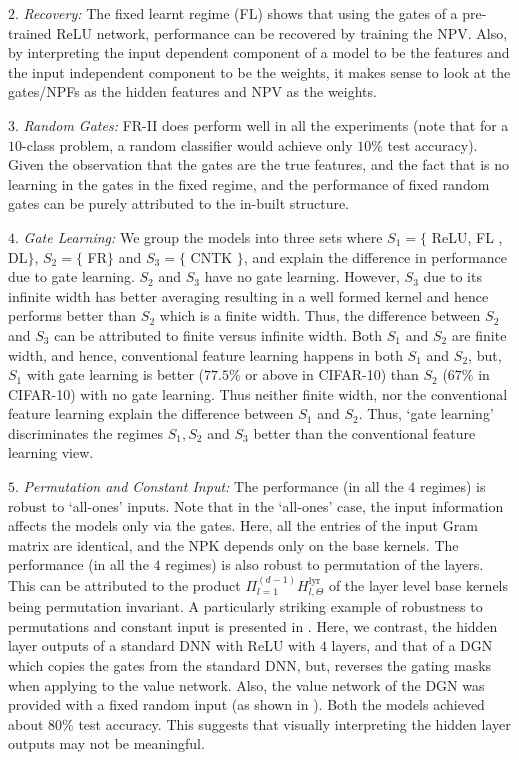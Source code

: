 \indent\quad $2.$ \emph{Recovery:} The fixed learnt regime  (FL) shows that using the gates of a pre-trained ReLU network, performance can be recovered by training the NPV. Also, by interpreting the input dependent component of a model to be the features and the input independent component to be the weights, it makes sense to look at the gates/NPFs as the hidden features and NPV as the weights.%

\indent\quad $3.$ \emph{Random Gates:} FR-II does perform well in all the experiments (note that for a $10$-class problem, a random classifier would achieve only $10\%$ test accuracy). Given the observation that the gates are the true features, and the fact that is no learning in the gates in the fixed regime, and the performance of fixed random gates can be purely attributed to the in-built structure.

\indent\quad $4.$ \emph{Gate Learning:} We group the models into three sets where $S_1=\{$ ReLU, FL , DL$\}$, $S_2=\{$ FR$\}$ and $S_3=\{$ CNTK $\}$, and explain the difference in performance due to gate learning.
 $S_2$ and $S_3$ have no gate learning. However,  $S_3$ due to its infinite width has better averaging resulting in a well formed kernel and hence performs better than $S_2$ which is a finite width. Thus, the difference between $S_2$ and $S_3$ can be attributed to finite versus infinite width. Both $S_1$ and $S_2$ are finite width, and hence, conventional feature learning happens in both $S_1$ and $S_2$, but, $S_1$ with gate learning is better ($77.5\%$ or above in CIFAR-10) than $S_2$ ($67\%$ in CIFAR-10) with no gate learning. Thus neither finite width, nor the conventional feature learning explain the difference between $S_1$ and $S_2$. Thus, `gate learning' discriminates the regimes $S_1, S_2$ and $S_3$ better than the conventional feature learning view.

\indent\quad $5.$ \emph{Permutation and Constant Input:} The performance (in all the $4$ regimes) is  robust to `all-ones' inputs. Note that in the `all-ones' case, the input information affects the models only via the gates. Here, all the entries of the input Gram matrix are identical, and the NPK depends only on the base kernels. The performance (in all the $4$ regimes) is also robust to permutation of the layers. This can be attributed to the product $\Pi_{l=1}^{(d-1)} H^{\text{lyr}}_{l,\Theta}$ of the layer level base kernels being permutation invariant. A particularly striking example of robustness to permutations and constant input is presented in . Here,  we contrast, the hidden layer outputs of a standard DNN with ReLU with $4$ layers, and that of a DGN which copies the gates from the standard DNN, but, reverses the gating masks when applying to the value network. Also, the value network of the DGN was provided with a fixed random input (as shown in ). Both the models achieved about $80\%$ test accuracy.  This suggests that visually interpreting the hidden layer outputs may not be meaningful.



